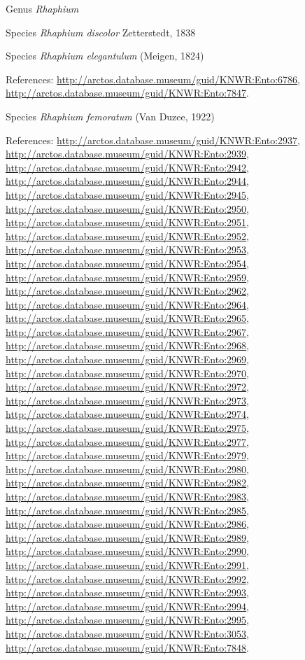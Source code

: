 \documentclass[9pt, article]{memoir}
\begin{document}
\begin{multicols}{2}
\vspace{6pt}\noindent\hspace{30pt}Genus \textit{Rhaphium}


\vspace{6pt}\noindent\hspace{36pt}Species \textit{Rhaphium discolor} Zetterstedt, 1838


\vspace{6pt}\noindent\hspace{36pt}Species \textit{Rhaphium elegantulum} (Meigen, 1824)


References: 
\url{http://arctos.database.museum/guid/KNWR:Ento:6786}, 
\url{http://arctos.database.museum/guid/KNWR:Ento:7847}.

\vspace{6pt}\noindent\hspace{36pt}Species \textit{Rhaphium femoratum} (Van Duzee, 1922)


References: 
\url{http://arctos.database.museum/guid/KNWR:Ento:2937}, 
\url{http://arctos.database.museum/guid/KNWR:Ento:2939}, 
\url{http://arctos.database.museum/guid/KNWR:Ento:2942}, 
\url{http://arctos.database.museum/guid/KNWR:Ento:2944}, 
\url{http://arctos.database.museum/guid/KNWR:Ento:2945}, 
\url{http://arctos.database.museum/guid/KNWR:Ento:2950}, 
\url{http://arctos.database.museum/guid/KNWR:Ento:2951}, 
\url{http://arctos.database.museum/guid/KNWR:Ento:2952}, 
\url{http://arctos.database.museum/guid/KNWR:Ento:2953}, 
\url{http://arctos.database.museum/guid/KNWR:Ento:2954}, 
\url{http://arctos.database.museum/guid/KNWR:Ento:2959}, 
\url{http://arctos.database.museum/guid/KNWR:Ento:2962}, 
\url{http://arctos.database.museum/guid/KNWR:Ento:2964}, 
\url{http://arctos.database.museum/guid/KNWR:Ento:2965}, 
\url{http://arctos.database.museum/guid/KNWR:Ento:2967}, 
\url{http://arctos.database.museum/guid/KNWR:Ento:2968}, 
\url{http://arctos.database.museum/guid/KNWR:Ento:2969}, 
\url{http://arctos.database.museum/guid/KNWR:Ento:2970}, 
\url{http://arctos.database.museum/guid/KNWR:Ento:2972}, 
\url{http://arctos.database.museum/guid/KNWR:Ento:2973}, 
\url{http://arctos.database.museum/guid/KNWR:Ento:2974}, 
\url{http://arctos.database.museum/guid/KNWR:Ento:2975}, 
\url{http://arctos.database.museum/guid/KNWR:Ento:2977}, 
\url{http://arctos.database.museum/guid/KNWR:Ento:2979}, 
\url{http://arctos.database.museum/guid/KNWR:Ento:2980}, 
\url{http://arctos.database.museum/guid/KNWR:Ento:2982}, 
\url{http://arctos.database.museum/guid/KNWR:Ento:2983}, 
\url{http://arctos.database.museum/guid/KNWR:Ento:2985}, 
\url{http://arctos.database.museum/guid/KNWR:Ento:2986}, 
\url{http://arctos.database.museum/guid/KNWR:Ento:2989}, 
\url{http://arctos.database.museum/guid/KNWR:Ento:2990}, 
\url{http://arctos.database.museum/guid/KNWR:Ento:2991}, 
\url{http://arctos.database.museum/guid/KNWR:Ento:2992}, 
\url{http://arctos.database.museum/guid/KNWR:Ento:2993}, 
\url{http://arctos.database.museum/guid/KNWR:Ento:2994}, 
\url{http://arctos.database.museum/guid/KNWR:Ento:2995}, 
\url{http://arctos.database.museum/guid/KNWR:Ento:3053}, 
\url{http://arctos.database.museum/guid/KNWR:Ento:7848}.


\end{multicols}
\end{document}
